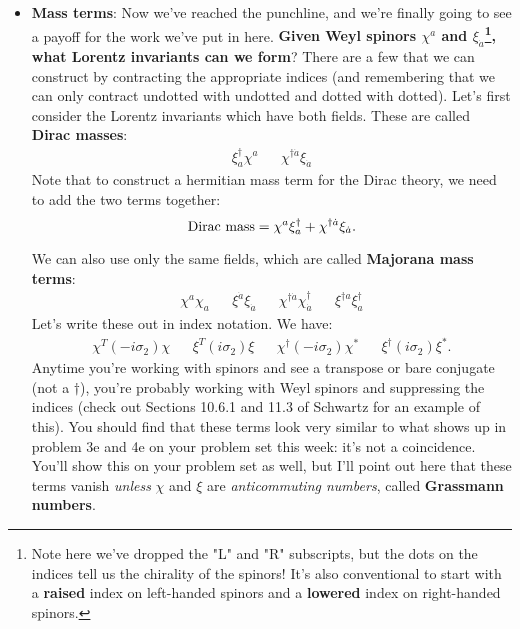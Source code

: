 \documentclass[12pt, oneside]{article}   	%
\theoremstyle{definition}
\begin{document}
\begin{itemize}
	\item \textbf{Mass terms}: Now we've reached the punchline, and we're finally going to see a payoff for the work we've put in here. \textbf{Given Weyl spinors $\chi^a$ and $\xi_{\dot a}$\footnote{Note here we've dropped the "L" and "R" subscripts, but the dots on the indices tell us the chirality of the spinors! It's also conventional to start with a \textbf{raised} index on left-handed spinors and a \textbf{lowered} index on right-handed spinors.}, what Lorentz invariants can we form}? There are a few that we can construct by contracting the appropriate indices (and remembering that we can only contract undotted with undotted and dotted with dotted). Let's first consider the Lorentz invariants which have both fields. These are called \textbf{Dirac masses}:
	\begin{align}
		\xi^\dagger_a \chi^a && \chi^{\dagger \dot a} \xi_{\dot a}
	\end{align}
	Note that to construct a hermitian mass term for the Dirac theory, we need to add the two terms together:
	\begin{equation}
		\textnormal{Dirac mass} = \chi^a \xi_a^\dagger + \chi^{\dagger \dot a} \xi_{\dot a}.\label{eq:dirac_mass}
	\end{equation}
	
	We can also use only the same fields, which are called \textbf{Majorana mass terms}:
	\begin{align}
		\chi^a \chi_{a} && \xi^{\dot a} \xi_{\dot a} && \chi^{\dagger\dot a} \chi^\dagger_{\dot a} && \xi^{\dagger a} \xi^\dagger_a
	\end{align}
	Let's write these out in index notation. We have:
	\begin{align}
		\chi^T (-i\sigma_2) \chi && \xi^T (i\sigma_2) \xi && \chi^\dagger (-i\sigma_2) \chi^* && \xi^\dagger (i\sigma_2) \xi^*.
	\end{align}
	Anytime you're working with spinors and see a transpose or bare conjugate (not a $\dagger$), you're probably working with Weyl spinors and suppressing the indices (check out Sections 10.6.1 and 11.3 of Schwartz for an example of this). You should find that these terms look very similar to what shows up in problem 3e and 4e on your problem set this week: it's not a coincidence. You'll show this on your problem set as well, but I'll point out here that these terms vanish \textit{unless} $\chi$ and $\xi$ are \textit{anticommuting numbers}, called \textbf{Grassmann numbers}. 
	

\end{itemize}
\end{document}
